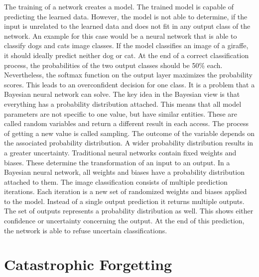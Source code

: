 The training of a network creates a model.
The trained model is capable of predicting the learned data.
However, the model is not able to determine, if the input is unrelated to the learned data and does not fit in any output class of the network.
\cite{bayesian_nn_need, explain_bayesian_nn}
\newline
An example for this case would be a neural network that is able to classify dogs and cats image classes.
If the model classifies an image of a giraffe, it should ideally predict neither dog or cat.
At the end of a correct classification process, the probabilities of the two output classes should be 50\% each.
Nevertheless, the softmax function on the output layer maximizes the probability scores.
This leads to an overconfident decision for one class.
It is a problem that a Bayesian neural network can solve.
\cite{bayesian_nn_need, explain_bayesian_nn}
\newline
The key idea in the Bayesian view is that everything has a probability distribution attached.
This means that all model parameters are not specific to one value, but have similar entities.
These are called random variables and return a different result in each access.
The process of getting a new value is called sampling.
The outcome of the variable depends on the associated probability distribution.
A wider probability distribution results in a greater uncertainty.
\cite{bayesian_nn_need, explain_bayesian_nn}
\newline
Traditional neural networks contain fixed weights and biases.
These determine the transformation of an input to an output.
In a Bayesian neural network, all weights and biases have a probability distribution attached to them.
The image classification consists of multiple prediction iterations.
Each iteration is a new set of randomized weights and biases applied to the model.
Instead of a single output prediction it returns multiple outputs.
The set of outputs represents a probability distribution as well.
This shows either confidence or uncertainty concerning the output.
At the end of this prediction, the network is able to refuse uncertain classifications.
\cite{bayesian_nn_need, explain_bayesian_nn}

\section{Catastrophic Forgetting}
\label{catastrophic_forgetting}

